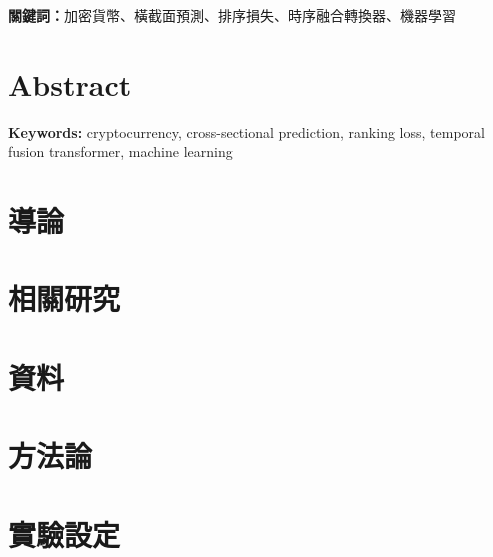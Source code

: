 \documentclass[12pt, a4paper, oneside]{ctexbook}
\begin{document}


\vspace{1em}
\noindent\textbf{關鍵詞：}加密貨幣、橫截面預測、排序損失、時序融合轉換器、機器學習

\chapter*{Abstract}
\thispagestyle{plain}



\vspace{1em}
\noindent\textbf{Keywords:} cryptocurrency, cross-sectional prediction, ranking loss,
temporal fusion transformer, machine learning

\tableofcontents
\listoffigures
\listoftables

\mainmatter

\chapter{導論}
\label{sec:intro}


\chapter{相關研究}
\label{sec:related}


\chapter{資料}
\label{sec:data}


\chapter{方法論}
\label{sec:method}


\chapter{實驗設定}
\label{sec:experiments}

\end{document}
